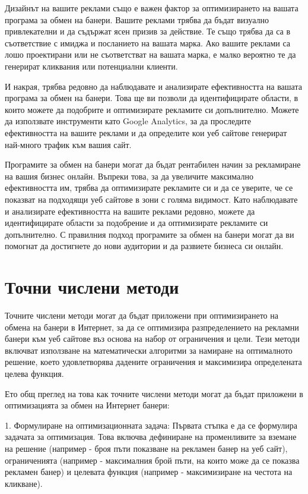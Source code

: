 Дизайнът на вашите реклами също е важен фактор за оптимизирането на вашата програма за обмен на банери. Вашите реклами трябва да бъдат визуално привлекателни и да съдържат ясен призив за действие. Те също трябва да са в съответствие с имиджа и посланието на вашата марка. Ако вашите реклами са лошо проектирани или не съответстват на вашата марка, е малко вероятно те да генерират кликвания или потенциални клиенти.

И накрая, трябва редовно да наблюдавате и анализирате ефективността на вашата програма за обмен на банери. Това ще ви позволи да идентифицирате области, в които можете да подобрите и оптимизирате рекламите си допълнително. Можете да използвате инструменти като Google Analytics, за да проследите ефективността на вашите реклами и да определите кои уеб сайтове генерират най-много трафик към вашия сайт.

Програмите за обмен на банери могат да бъдат рентабилен начин за рекламиране на вашия бизнес онлайн. Въпреки това, за да увеличите максимално ефективността им, трябва да оптимизирате рекламите си и да се уверите, че се показват на подходящи уеб сайтове в зони с голяма видимост. Като наблюдавате и анализирате ефективността на вашите реклами редовно, можете да идентифицирате области за подобрение и да оптимизирате рекламите си допълнително. С правилния подход програмите за обмен на банери могат да ви помогнат да достигнете до нови аудитории и да развиете бизнеса си онлайн.

\section{Точни числени методи}

Точните числени методи могат да бъдат приложени при оптимизирането на обмена на банери в Интернет, за да се оптимизира разпределението на рекламни банери към уеб сайтове въз основа на набор от ограничения и цели. Тези методи включват използване на математически алгоритми за намиране на оптималното решение, което удовлетворява дадените ограничения и максимизира определената целева функция.

Ето общ преглед на това как точните числени методи могат да бъдат приложени в оптимизацията за обмен на Интернет банери:

1. Формулиране на оптимизационната задача: Първата стъпка е да се формулира задачата за оптимизация. Това включва дефиниране на променливите за вземане на решение (например - броя пъти показване на рекламен банер на уеб сайт), ограниченията (например - максималния брой пъти, на които може да се показва рекламен банер) и целевата функция (например - максимизиране на честота на кликване).

